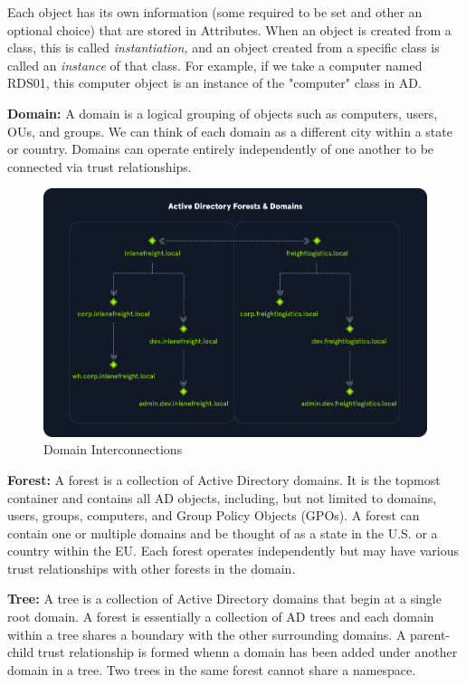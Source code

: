 Each object has its own information (some required to be set and other an optional choice) that are stored in Attributes. When an object is created from a class, this is called \textit{instantiation,} and an object created from a specific class is called an \textit{instance} of that class. For example, if we take a computer named RDS01, this computer object is an instance of the "computer" class in AD.

\textbf{Domain:}
A domain is a logical grouping of objects such as computers, users, OUs, and groups. We can think of each domain as a different city within a state or country. Domains can operate entirely independently of one another to be connected via trust relationships.

\begin{figure}
    \centering
    \includegraphics[width=0.75\linewidth]{domain.png}
    \caption{Domain Interconnections}
    \label{fig:placeholder}
\end{figure}


\textbf{Forest:}
A forest is a collection of Active Directory domains. It is the topmost container and contains all AD objects, including, but not limited to domains, users, groups, computers, and Group Policy Objects (GPOs). A forest can contain one or multiple domains and be thought of as a state in the U.S. or a country within the EU. Each forest operates independently but may have various trust relationships with other forests in the domain.

\textbf{Tree:}
A tree is a collection of Active Directory domains that begin at a single root domain. A forest is essentially a collection of AD trees and each domain within a tree shares a boundary with the other surrounding domains. A parent-child trust relationship is formed whenn a domain has been added under another domain in a tree. Two trees in the same forest cannot share a namespace.


